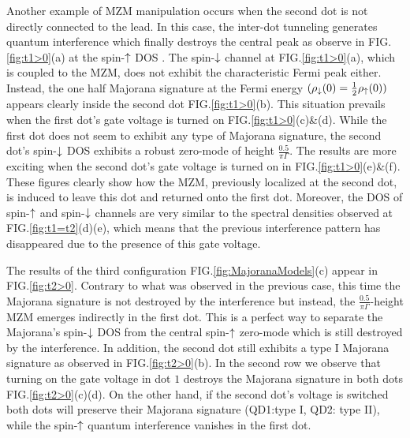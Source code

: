 \documentclass[showpacs,aps,prb,reprint,superscriptaddress]{revtex4-1}
\begin{document}
    Another example of MZM manipulation occurs when the second dot is not directly connected to the lead. In this case, the inter-dot tunneling generates quantum interference which finally destroys the central peak as observe in FIG.\ref{fig:t1>0}(a) at the spin-$\uparrow$ DOS . The spin-$\downarrow$ channel at FIG.\ref{fig:t1>0}(a), which is coupled to the MZM, does not exhibit the characteristic Fermi peak either. Instead, the one half Majorana signature at the Fermi energy $(\rho_\downarrow(0) = \frac{1}{2}\rho_\uparrow(0))$ appears clearly inside the second dot FIG.\ref{fig:t1>0}(b). This situation prevails when the first dot's gate voltage is turned on FIG.\ref{fig:t1>0}(c)\&(d). While the first dot does not seem to exhibit any type of Majorana signature, the second dot's spin-$\downarrow$ DOS exhibits a robust zero-mode of height $\frac{0.5}{\pi \Gamma}$. The results are more exciting when the second dot's gate voltage is turned on in FIG.\ref{fig:t1>0}(e)\&(f). These figures clearly show how the MZM, previously localized at the second dot, is induced to leave this dot and returned onto the first dot. Moreover, the DOS of spin-$\uparrow$ and spin-$\downarrow$ channels are very similar to the spectral densities observed at FIG.\ref{fig:t1=t2}(d)(e), which means that the previous interference pattern has disappeared due to the presence of this gate voltage. 

    The results of the third configuration FIG.\ref{fig:MajoranaModels}(c) appear in FIG.\ref{fig:t2>0}. Contrary to what was observed in the previous case, this time the Majorana signature is not destroyed by the interference but instead, the  $\frac{0.5}{\pi \Gamma}$-height MZM emerges indirectly in the first dot. This is a perfect way to separate the Majorana's spin-$\downarrow$ DOS from the central spin-$\uparrow$ zero-mode which is still destroyed by the interference. In addition, the second dot still exhibits a type I Majorana signature as observed in FIG.\ref{fig:t2>0}(b). In the second row we observe that turning on the gate voltage in dot $1$  destroys the Majorana signature in both dots FIG.\ref{fig:t2>0}(c)(d). On the other hand, if the second dot's voltage is switched both dots will preserve their Majorana signature (QD1:type I, QD2: type II), while the spin-$\uparrow$ quantum interference vanishes in the first dot. 

\end{document}
